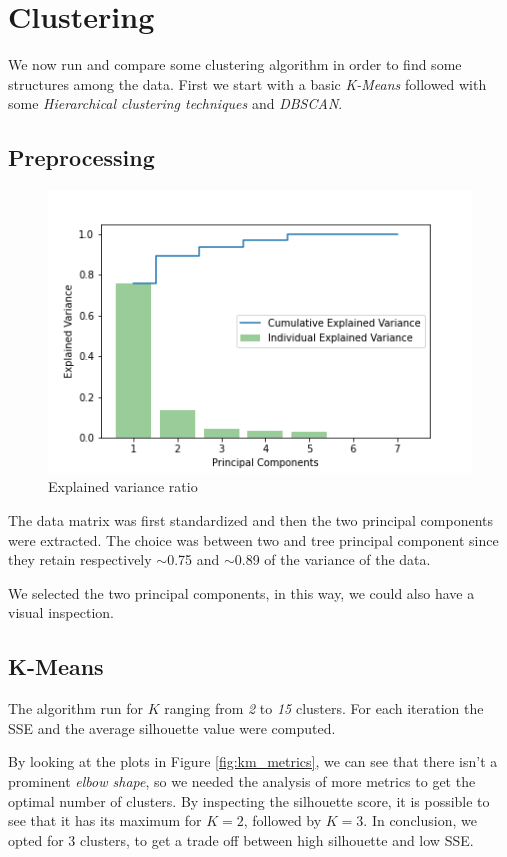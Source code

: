\section{Clustering}
We now run and compare some clustering algorithm in order to find some structures among the data. First we start with a basic \emph{K-Means} followed with some \emph{Hierarchical clustering techniques} and \emph{DBSCAN}. 
\subsection{Preprocessing}

\begin{figure}
\vspace{-13mm}
\centering
\captionsetup{justification=centering}
\includegraphics[width=.4\textwidth]{img/clustering/pca.png}
\caption{Explained variance ratio}
\label{fig:pca_img}
\end{figure}

The data matrix was first standardized and then the two principal components were extracted. The choice was between two and tree principal component since they retain respectively $\sim$0.75 and $\sim$0.89 of the variance of the data.

We selected the two principal components, in this way, we could also have a visual inspection.

\subsection{K-Means}
The algorithm run for $K$ ranging from \emph{2} to \emph{15} clusters. For each iteration the SSE and the average silhouette value were computed.

By looking at the plots in Figure \ref{fig:km_metrics}, we can see that there isn't a prominent \emph{elbow shape}, so we needed the analysis of more metrics to get the optimal number of clusters. By inspecting the silhouette score, it is possible to see that it has its maximum for $K = 2$, followed by $K = 3$. In conclusion, we opted for 3 clusters, to get a trade off between high silhouette and low SSE.

